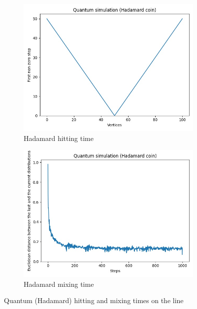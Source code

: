 \begin{figure}[H]
  \centering
  \begin{subfigure}{.45\linewidth}
    \centering
    \includegraphics[width=\linewidth]{./figures/results/path/hadamard_hitting_time.jpg}
    \caption{Hadamard hitting time}
  \end{subfigure}
  \begin{subfigure}{.45\linewidth}
    \centering
    \includegraphics[width=\linewidth]{./figures/results/path/hadamard_mixing_time.jpg}
    \caption{Hadamard mixing time}
  \end{subfigure}
  \caption{Quantum (Hadamard) hitting and mixing times on the line}
\end{figure}

